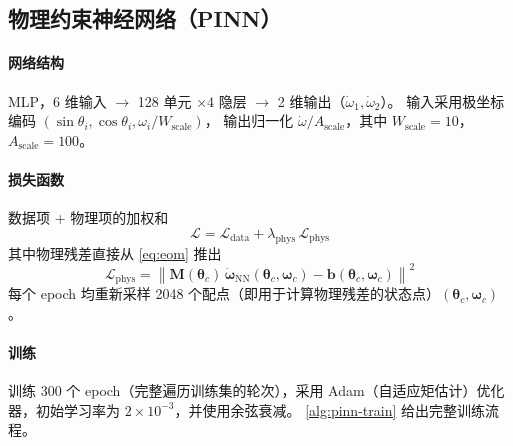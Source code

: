 \documentclass[a4paper,12pt]{ctexart}   %
\begin{document}
\subsection{物理约束神经网络（PINN）}
\label{sec:pinn}

\paragraph{网络结构} MLP，6 维输入 $\to$ 128 单元 $\times 4$ 隐层 $\to$ 2 维输出（$\dot\omega_1, \dot\omega_2$）。
输入采用极坐标编码 $(\sin\theta_i, \cos\theta_i, \omega_i / W_{\text{scale}})$，
输出归一化 $\dot\omega / A_{\text{scale}}$，其中 $W_{\text{scale}} = 10$，$A_{\text{scale}} = 100$。

\paragraph{损失函数} 数据项 + 物理项的加权和
\begin{equation}
\mathcal{L} = \mathcal{L}_{\text{data}} + \lambda_{\text{phys}} \, \mathcal{L}_{\text{phys}}
\label{eq:pinn-loss}
\end{equation}
其中物理残差直接从 \cref{eq:eom} 推出
\begin{equation}
\mathcal{L}_{\text{phys}} = \left\| \bm{M}(\bm{\theta}_c) \, \dot{\bm{\omega}}_{\text{NN}}(\bm{\theta}_c, \bm{\omega}_c)
- \bm{b}(\bm{\theta}_c, \bm{\omega}_c) \right\|^2
\end{equation}
每个 epoch 均重新采样 2048 个配点（即用于计算物理残差的状态点）$(\bm{\theta}_c, \bm{\omega}_c)$。

\paragraph{训练} 训练 300 个 epoch（完整遍历训练集的轮次），采用 Adam（自适应矩估计）优化器，初始学习率为 $2 \times 10^{-3}$，并使用余弦衰减。
\cref{alg:pinn-train} 给出完整训练流程。
\end{document}
